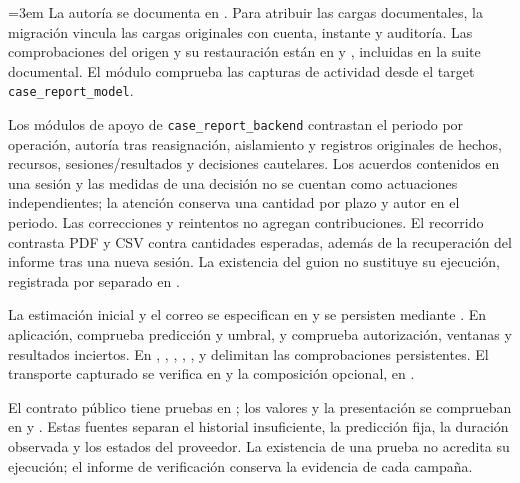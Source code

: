 {\emergencystretch=3em La autoría se documenta en
. Para atribuir
las cargas documentales, la migración
 vincula las cargas
originales con cuenta, instante y auditoría. Las comprobaciones del origen y su
restauración están en  y
, incluidas en la suite documental.
El módulo  comprueba las capturas de
actividad desde el target \texttt{case\_report\_model}.\par}

Los módulos de apoyo de \texttt{case\_report\_backend} contrastan el periodo
por operación, autoría tras reasignación, aislamiento y registros originales
de hechos, recursos, sesiones/resultados y decisiones cautelares. Los acuerdos
contenidos en una sesión y las medidas de una decisión no se cuentan como
actuaciones independientes; la atención conserva una cantidad por plazo y
autor en el periodo. Las correcciones y reintentos no agregan contribuciones.
El recorrido  contrasta
PDF y CSV contra cantidades esperadas, además de la recuperación del informe
tras una nueva sesión. La existencia del guion no sustituye su ejecución,
registrada por separado en .

{\raggedright
La estimaci\'on inicial y el correo se especifican en
 y se persisten mediante
. En aplicaci\'on,
 comprueba predicci\'on y umbral, y
 comprueba autorizaci\'on, ventanas y resultados
inciertos. En ,
, , ,
,  y
 delimitan las comprobaciones persistentes.
El transporte capturado se verifica en
 y la composici\'on
opcional, en .\par}

{\raggedright
El contrato p\'ublico tiene pruebas en
; los valores
y la presentaci\'on se comprueban en
 y
. Estas fuentes separan
el historial insuficiente, la predicci\'on fija, la duraci\'on observada y los
estados del proveedor. La existencia de una prueba no acredita su ejecuci\'on;
el informe de verificaci\'on conserva la evidencia de cada campa\~na.\par}

